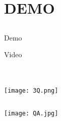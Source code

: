 \documentclass[xcolor=table,compress,blue]{beamer}
\begin{document}
\section{DEMO}
\subsection{}
\begin{frame}{Demo}
	\begin{exampleblock}{Video}
	\end{exampleblock}
\end{frame}



\section{}
\begin{frame}[plain]
	\thispagestyle{empty}
	\begin{columns}
		\begin{column}{\paperwidth}
			\texttt{[image: 3Q.png]}
		\end{column}
	\end{columns}
\end{frame}

\begin{frame}[plain]
	\thispagestyle{empty}
	\begin{columns}
		\begin{column}{\paperwidth}
			\texttt{[image: QA.jpg]}
		\end{column}
	\end{columns}
\end{frame}
\end{document}
